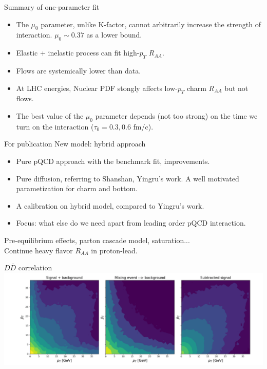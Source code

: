 \documentclass[11pt]{beamer}
\begin{document}
\begin{frame}{Summary of one-parameter fit}
\begin{itemize}
\item The $\mu_0$ parameter, unlike K-factor, cannot arbitrarily increase the strength of interaction. $\mu_0 \sim 0.37$ as a lower bound.
\item Elastic + inelastic process can fit high-$p_T$ $R_{AA}$.
\item Flows are systemically lower than data.
\item At LHC energies, Nuclear PDF stongly affects low-$p_T$ charm $R_{AA}$ but not flows. 
\item The best value of the $\mu_0$ parameter depends (not too strong) on the time we turn on the interaction ($\tau_0=0.3, 0.6$ fm/c).
\end{itemize}

\end{frame}

\begin{frame}{For publication}
New model: hybrid approach
\begin{itemize}
\item Pure pQCD approach with the benchmark fit, improvements.
\item Pure diffusion, referring to Shanshan, Yingru's work. A well motivated parametization for charm and bottom.
\item A calibration on hybrid model, compared to Yingru's work.
\item Focus: what else do we need apart from leading order pQCD interaction. 
\end{itemize}

Pre-equilibrium effects, parton cascade model, saturation... \\

Continue heavy flavor $R_{AA}$ in proton-lead.\\

\end{frame}


\begin{frame}{$D\bar{D}$ correlation}
\includegraphics[width=\textwidth]{fig/subtraction.png}
\end{frame}
\end{document}
